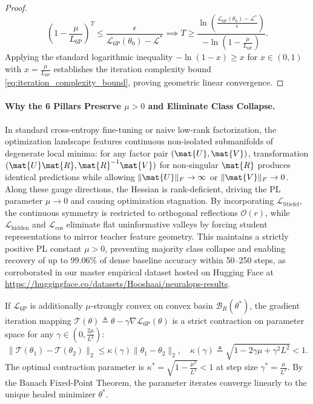 \begin{proof}
\begin{equation}
\left( 1 - \frac{\mu}{L_{\text{6P}}} \right)^T \le \frac{\epsilon}{\mathcal{L}_{\text{6P}}(\theta_0) - \mathcal{L}^*} \implies T \ge \frac{\ln\left( \frac{\mathcal{L}_{\text{6P}}(\theta_0) - \mathcal{L}^*}{\epsilon} \right)}{-\ln\left(1 - \frac{\mu}{L_{\text{6P}}}\right)}.
\end{equation}
Applying the standard logarithmic inequality $-\ln(1 - x) \ge x$ for $x \in (0, 1)$ with $x = \frac{\mu}{L_{\text{6P}}}$ establishes the iteration complexity bound \eqref{eq:iteration_complexity_bound}, proving geometric linear convergence.
\end{proof}

\paragraph{Why the 6 Pillars Preserve $\mu > 0$ and Eliminate Class Collapse.}
In standard cross-entropy fine-tuning or naive low-rank factorization, the optimization landscape features continuous non-isolated submanifolds of degenerate local minima: for any factor pair $(\mat{U}, \mat{V})$, transformation $(\mat{U}\mat{R}, \mat{R}^{-1}\mat{V})$ for non-singular $\mat{R}$ produces identical predictions while allowing $\|\mat{U}\|_F \to \infty$ or $\|\mat{V}\|_F \to 0$. Along these gauge directions, the Hessian is rank-deficient, driving the PL parameter $\mu \to 0$ and causing optimization stagnation.
By incorporating $\mathcal{L}_{\text{Stiefel}}$, the continuous symmetry is restricted to orthogonal reflections $\mathcal{O}(r)$, while $\mathcal{L}_{\text{hidden}}$ and $\mathcal{L}_{\text{cos}}$ eliminate flat uninformative valleys by forcing student representations to mirror teacher feature geometry. This maintains a strictly positive PL constant $\mu > 0$, preventing majority class collapse and enabling recovery of up to $99.06\%$ of dense baseline accuracy within 50--250 steps, as corroborated in our master empirical dataset hosted on Hugging Face at \url{https://huggingface.co/datasets/Hooshaai/neuralops-results}.

\begin{corollary}
\label{cor:banach_contraction}
If $\mathcal{L}_{\text{6P}}$ is additionally $\mu$-strongly convex on convex basin $\mathcal{B}_R(\theta^*)$, the gradient iteration mapping $\mathcal{T}(\theta) \triangleq \theta - \gamma \nabla \mathcal{L}_{\text{6P}}(\theta)$ is a strict contraction on parameter space for any $\gamma \in \left(0, \frac{2\mu}{L^2}\right)$:
\begin{equation}
\| \mathcal{T}(\theta_1) - \mathcal{T}(\theta_2) \|_2 \le \kappa(\gamma) \| \theta_1 - \theta_2 \|_2, \quad \kappa(\gamma) \triangleq \sqrt{1 - 2\gamma \mu + \gamma^2 L^2} < 1.
\label{eq:banach_bound}
\end{equation}
The optimal contraction parameter is $\kappa^* = \sqrt{1 - \frac{\mu^2}{L^2}} < 1$ at step size $\gamma^* = \frac{\mu}{L^2}$. By the Banach Fixed-Point Theorem, the parameter iterates converge linearly to the unique healed minimizer $\theta^*$.
\end{corollary}

